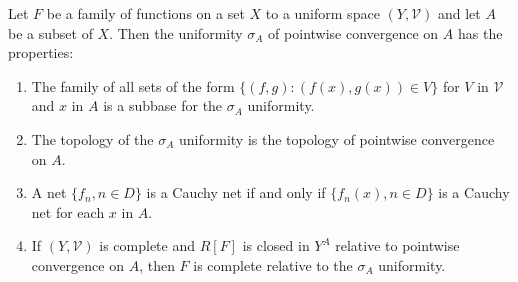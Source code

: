 Let $F$ be a family of functions on a set $X$ to a uniform space $(Y, \mathcal{V})$ and let $A$ be a subset of $X$. Then the uniformity $\sigma_A$ of pointwise convergence on $A$ has the properties:

\begin{enumerate}
\item[(a)] The family of all sets of the form $\{(f, g): (f(x), g(x)) \in V\}$ for $V$ in $\mathcal{V}$ and $x$ in $A$ is a subbase for the $\sigma_A$ uniformity.
\item[(b)] The topology of the $\sigma_A$ uniformity is the topology of pointwise convergence on $A$.
\item[(c)] A net $\{f_n, n \in D\}$ is a Cauchy net if and only if $\{f_n(x), n \in D\}$ is a Cauchy net for each $x$ in $A$.
\item[(d)] If $(Y, \mathcal{V})$ is complete and $R[F]$ is closed in $Y^A$ relative to pointwise convergence on $A$, then $F$ is complete relative to the $\sigma_A$ uniformity.
\end{enumerate}
